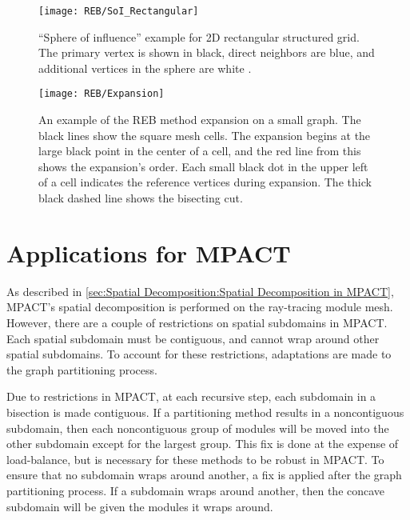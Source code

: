 {{{{        \begin{figure}
          \centering
          \texttt{[image: REB/SoI\_Rectangular]}
          \caption{
              ``Sphere of influence'' example for 2D rectangular structured grid.
              The primary vertex is shown in black, direct neighbors are blue, and additional vertices in the sphere are white \cite{Fitzgerald2017}.
              \label{fig:Spatial Decomposition:Sphere of Influence}
          }
        \end{figure}

        \begin{figure}
          \centering
          \texttt{[image: REB/Expansion]}
          \caption{
              An example of the REB method expansion on a small graph.
              The black lines show the square mesh cells.
              The expansion begins at the large black point in the center of a cell, and the red line from this shows the expansion's order.
              Each small black dot in the upper left of a cell indicates the reference vertices during expansion.
              The thick black dashed line shows the bisecting cut.
              \label{fig:Spatial Decomposition:REB Expansion Order}
          }
        \end{figure}

      }
    }
  }
  \section{Applications for MPACT}{\label{sec:Spatial Decomposition:Applications for MPACT}
    As described in \cref{sec:Spatial Decomposition:Spatial Decomposition in MPACT}, MPACT's spatial decomposition is performed on the ray-tracing module mesh.
    However, there are a couple of restrictions on spatial subdomains in MPACT.
    Each spatial subdomain must be contiguous, and cannot wrap around other spatial subdomains.
    To account for these restrictions, adaptations are made to the graph partitioning process.

    Due to restrictions in MPACT, at each recursive step, each subdomain in a bisection is made contiguous.
    If a partitioning method results in a noncontiguous subdomain, then each noncontiguous group of modules will be moved into the other subdomain except for the largest group.
    This fix is done at the expense of load-balance, but is necessary for these methods to be robust in MPACT.
    To ensure that no subdomain wraps around another, a fix is applied after the graph partitioning process.
    If a subdomain wraps around another, then the concave subdomain will be given the modules it wraps around.

}}
